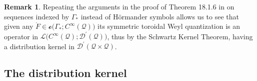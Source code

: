 \documentclass[12pt]{article}
\theoremstyle{definition}
\newtheorem{remark}[theorem]{Remark}
\def\T{\mathcal{Q}}
\numberwithin{equation}{section}
\begin{document}
\begin{remark}\label{R-ker-Op-Hsymb}
	 Repeating the arguments in the proof of Theorem 18.1.6 in \cite{Ho-3} on sequences indexed by $\Gamma_*$ instead of H\"{o}rmander symbols allows us to see that given any ${\mathring{F}\in\mathcal{o}\big(\Gamma_*;C^\infty(\T)\big)}$ its symmetric toroidal Weyl quantization is an operator in $\mathcal{L}\big(C^\infty(\T);\mathscr{D}^\prime(\T)\big)$, thus by the Schwartz Kernel Theorem, having a distribution kernel in $\mathscr{D}^\prime(\T\times\T)$.
\end{remark}

 \subsection{The distribution kernel }
\end{document}
